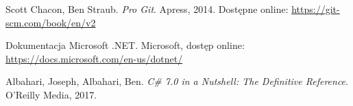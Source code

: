 \documentclass[polish,12pt,twoside,a4paper]{report}
\begin{document}




\newpage

\newpage

\newpage

\newpage

\newpage

\newpage

\begin{thebibliography}{9}

Scott Chacon, Ben Straub. \textit{Pro Git}. Apress, 2014. Dostępne online: \url{https://git-scm.com/book/en/v2}

Dokumentacja Microsoft .NET. Microsoft, dostęp online: \url{https://docs.microsoft.com/en-us/dotnet/}

Albahari, Joseph, Albahari, Ben. \textit{C\# 7.0 in a Nutshell: The Definitive Reference}. O'Reilly Media, 2017.

\end{thebibliography}
\newpage


\end{document}
